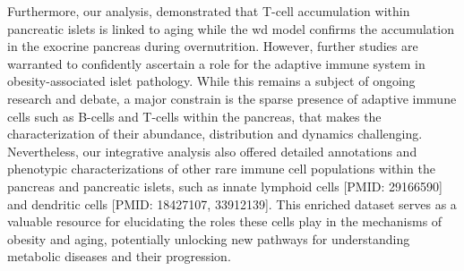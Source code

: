 \par Furthermore, our analysis, demonstrated that T-cell accumulation within pancreatic islets is linked to aging while the \gls{wd} model confirms the accumulation in the exocrine pancreas during overnutrition. However, further studies are warranted to confidently ascertain a role for the adaptive immune system in obesity-associated islet pathology. While this remains a subject of ongoing research and debate, a major constrain is the sparse presence of adaptive immune cells such as B-cells and T-cells within the pancreas, that makes the characterization of their abundance, distribution and dynamics challenging. Nevertheless, our integrative analysis also offered detailed annotations and phenotypic characterizations of other rare immune cell populations within the pancreas and pancreatic islets, such as innate lymphoid cells [PMID: 29166590] and dendritic cells [PMID: 18427107, 33912139]. This enriched dataset serves as a valuable resource for elucidating the roles these cells play in the mechanisms of obesity and aging, potentially unlocking new pathways for understanding metabolic diseases and their progression.\\

